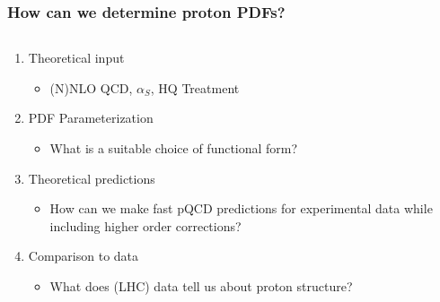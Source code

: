 \documentclass[10pt]{beamer}
\begin{document}
\begin{frame}
\frametitle{How can we determine proton PDFs?}

\begin{columns}
\begin{column}{0.6\textwidth}
\begin{enumerate}
\item<1-> Theoretical input
\begin{itemize}
\item (N)NLO QCD, $\alpha_S$, HQ Treatment
\end{itemize}
\vskip15pt
\item<1-> PDF Parameterization
\begin{itemize}
\item What is a suitable choice of functional form?
\end{itemize}
\vskip15pt

\item<1-> Theoretical predictions
\begin{itemize}
\item How can we make fast pQCD predictions for experimental data while including higher order corrections?
\end{itemize}
\vskip15pt

\item<1-> Comparison to data
\begin{itemize}
\item What does (LHC) data tell us about proton structure?
\end{itemize}
\end{enumerate}
\end{column}
\begin{column}{0.3\textwidth}

\end{column}
\end{columns}
\end{frame}
\end{document}
